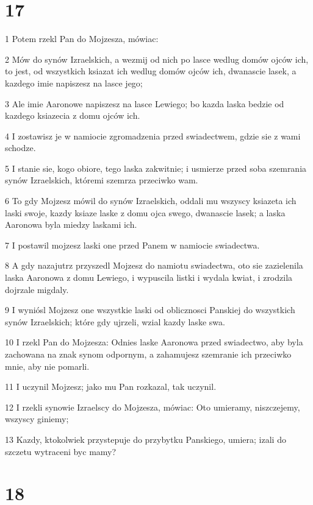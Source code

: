 \chapter{17}

\par 1 Potem rzekl Pan do Mojzesza, mówiac:
\par 2 Mów do synów Izraelskich, a wezmij od nich po lasce wedlug domów ojców ich, to jest, od wszystkich ksiazat ich wedlug domów ojców ich, dwanascie lasek, a kazdego imie napiszesz na lasce jego;
\par 3 Ale imie Aaronowe napiszesz na lasce Lewiego; bo kazda laska bedzie od kazdego ksiazecia z domu ojców ich.
\par 4 I zostawisz je w namiocie zgromadzenia przed swiadectwem, gdzie sie z wami schodze.
\par 5 I stanie sie, kogo obiore, tego laska zakwitnie; i usmierze przed soba szemrania synów Izraelskich, któremi szemrza przeciwko wam.
\par 6 To gdy Mojzesz mówil do synów Izraelskich, oddali mu wszyscy ksiazeta ich laski swoje, kazdy ksiaze laske z domu ojca swego, dwanascie lasek; a laska Aaronowa byla miedzy laskami ich.
\par 7 I postawil mojzesz laski one przed Panem w namiocie swiadectwa.
\par 8 A gdy nazajutrz przyszedl Mojzesz do namiotu swiadectwa, oto sie zazielenila laska Aaronowa z domu Lewiego, i wypuscila listki i wydala kwiat, i zrodzila dojrzale migdaly.
\par 9 I wyniósl Mojzesz one wszystkie laski od oblicznosci Panskiej do wszystkich synów Izraelskich; które gdy ujrzeli, wzial kazdy laske swa.
\par 10 I rzekl Pan do Mojzesza: Odnies laske Aaronowa przed swiadectwo, aby byla zachowana na znak synom odpornym, a zahamujesz szemranie ich przeciwko mnie, aby nie pomarli.
\par 11 I uczynil Mojzesz; jako mu Pan rozkazal, tak uczynil.
\par 12 I rzekli synowie Izraelscy do Mojzesza, mówiac: Oto umieramy, niszczejemy, wszyscy giniemy;
\par 13 Kazdy, ktokolwiek przystepuje do przybytku Panskiego, umiera; izali do szczetu wytraceni byc mamy?

\chapter{18}

